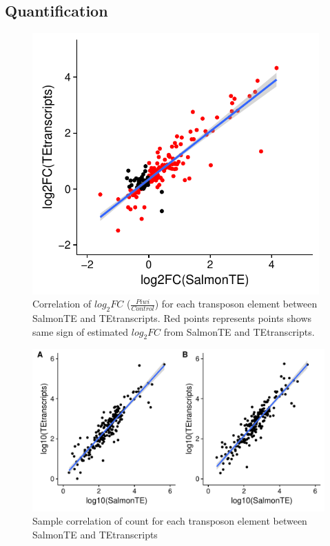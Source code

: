 \documentclass{ws-procs11x85}
\begin{document}
\subsection{Quantification}
\begin{figure}[h]
\centerline{
\includegraphics[width=11cm]{figure_corr_FC}
}
\caption{Correlation of $log_{2}FC$ ($\frac{Piwi}{Control}$) for each transposon element between SalmonTE and TEtranscripts. Red points represents points shows same sign of estimated $log_{2}FC$ from SalmonTE and TEtranscripts.}
\label{aba:fig2}
\end{figure}

\begin{figure}[h]
\centerline{
\includegraphics[width=16cm]{figure_corr_count}
}
\caption{Sample correlation of count for each transposon element between SalmonTE and TEtranscripts}
\label{aba:fig3}
\end{figure}
\end{document}
